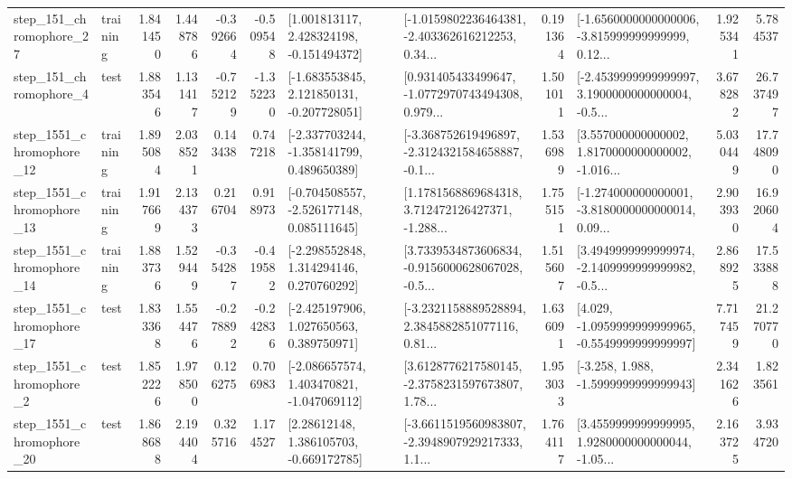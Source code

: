 \begin{tabular}{llrrrrllrlrr}
  step\_151\_chromophore\_27 &  training &      1.841450 &    1.448786 &     -0.392664 & -0.509548 &    [1.001813117, 2.428324198, -0.151494372] &  [-1.0159802236464381, -2.403362616212253, 0.34... &       0.191364 &  [-1.6560000000000006, -3.815999999999999, 0.12... &            1.925341 &          5.784537 \\
   step\_151\_chromophore\_4 &      test &      1.883546 &    1.131417 &     -0.752129 & -1.352230 &   [-1.683553845, 2.121850131, -0.207728051] &  [0.931405433499647, -1.0772970743494308, 0.979... &       1.501011 &  [-2.4539999999999997, 3.1900000000000004, -0.5... &            3.678282 &         26.737497 \\
 step\_1551\_chromophore\_12 &  training &      1.895084 &    2.038521 &      0.143438 &  0.747218 &   [-2.337703244, -1.358141799, 0.489650389] &  [-3.368752619496897, -2.3124321584658887, -0.1... &       1.536989 &  [3.557000000000002, 1.8170000000000002, -1.016... &            5.030449 &         17.748090 \\
 step\_1551\_chromophore\_13 &  training &      1.917669 &    2.134373 &      0.216704 &  0.918973 &   [-0.704508557, -2.526177148, 0.085111645] &  [1.1781568869684318, 3.712472126427371, -1.288... &       1.755151 &  [-1.274000000000001, -3.8180000000000014, 0.09... &            2.903930 &         16.920604 \\
 step\_1551\_chromophore\_14 &  training &      1.883736 &    1.529449 &     -0.354287 & -0.419582 &    [-2.298552848, 1.314294146, 0.270760292] &  [3.7339534873606834, -0.9156000628067028, -0.5... &       1.515607 &  [3.4949999999999974, -2.1409999999999982, -0.5... &            2.868925 &         17.533888 \\
 step\_1551\_chromophore\_17 &      test &      1.833368 &    1.554476 &     -0.278892 & -0.242836 &    [-2.425197906, 1.027650563, 0.389750971] &  [-3.2321158889528894, 2.3845882851077116, 0.81... &       1.636091 &  [4.029, -1.0959999999999965, -0.5549999999999997] &            7.717459 &         21.270770 \\
  step\_1551\_chromophore\_2 &      test &      1.852226 &    1.978500 &      0.126275 &  0.706983 &   [-2.086657574, 1.403470821, -1.047069112] &  [3.6128776217580145, -2.3758231597673807, 1.78... &       1.953033 &               [-3.258, 1.988, -1.5999999999999943] &            2.341626 &          1.823561 \\
 step\_1551\_chromophore\_20 &      test &      1.868688 &    2.194404 &      0.325716 &  1.174527 &     [2.28612148, 1.386105703, -0.669172785] &  [-3.6611519560983807, -2.3948907929217333, 1.1... &       1.764117 &  [3.4559999999999995, 1.9280000000000044, -1.05... &            2.163725 &          3.934720 \\

\end{tabular}
